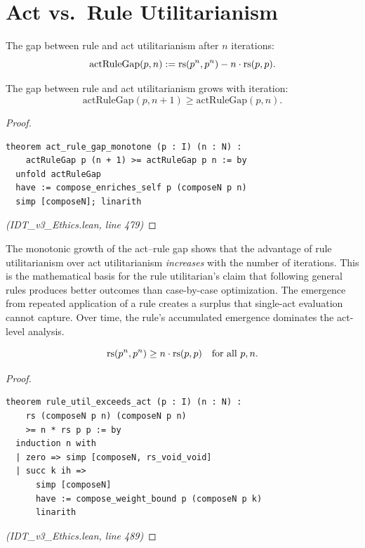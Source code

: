 \section{Act vs.\ Rule Utilitarianism}

\begin{definition}
\label{def:act-rule-gap}
The gap between rule and act utilitarianism after $n$ iterations:
\[
  \mathrm{actRuleGap}(p, n) := \mathrm{rs}(p^n, p^n) - n \cdot \mathrm{rs}(p, p).
\]
\end{definition}

\begin{theorem}
\label{thm:act-rule-gap-mono}
The gap between rule and act utilitarianism grows with iteration:
\[
  \mathrm{actRuleGap}(p, n+1) \geq \mathrm{actRuleGap}(p, n).
\]
\end{theorem}

\begin{proof}
\begin{lstlisting}
theorem act_rule_gap_monotone (p : I) (n : N) :
    actRuleGap p (n + 1) >= actRuleGap p n := by
  unfold actRuleGap
  have := compose_enriches_self p (composeN p n)
  simp [composeN]; linarith
\end{lstlisting}
\textit{(IDT\_v3\_Ethics.lean, line 479)}
\end{proof}

\begin{interpretation}
The monotonic growth of the act--rule gap shows that the advantage of rule
utilitarianism over act utilitarianism \emph{increases} with the number of
iterations. This is the mathematical basis for the rule utilitarian's claim
that following general rules produces better outcomes than case-by-case
optimization. The emergence from repeated application of a rule creates a
surplus that single-act evaluation cannot capture. Over time, the rule's
accumulated emergence dominates the act-level analysis.
\end{interpretation}

\begin{theorem}
\label{thm:rule-exceeds-act}
\[
  \mathrm{rs}(p^n, p^n) \geq n \cdot \mathrm{rs}(p, p) \quad\text{for all } p, n.
\]
\end{theorem}

\begin{proof}
\begin{lstlisting}
theorem rule_util_exceeds_act (p : I) (n : N) :
    rs (composeN p n) (composeN p n)
    >= n * rs p p := by
  induction n with
  | zero => simp [composeN, rs_void_void]
  | succ k ih =>
      simp [composeN]
      have := compose_weight_bound p (composeN p k)
      linarith
\end{lstlisting}
\textit{(IDT\_v3\_Ethics.lean, line 489)}
\end{proof}

